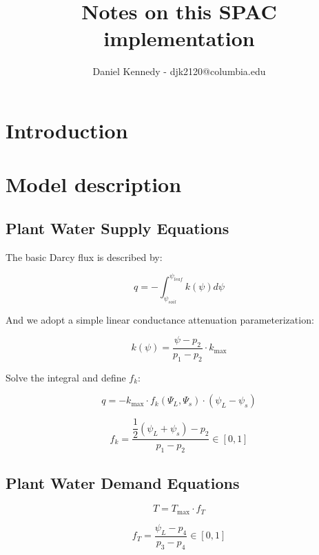 \documentclass[11pt]{article}
\title{Notes on this SPAC implementation\large}
\author{Daniel Kennedy - djk2120@columbia.edu 
}
\begin{document}
\maketitle

\section{Introduction}

\clearpage
\section{Model description}

\subsection{Plant Water Supply Equations}

The basic Darcy flux is described by:

\begin{equation}
q = -\int_{\psi_{soil}}^{\psi_{leaf}}{k\left(\psi\right)d\psi}
\end{equation}

And we adopt a simple linear conductance attenuation parameterization:

\begin{equation}
k(\psi) = \dfrac{\psi - p_2}{p_1 - p_2} \cdot k_\text{max}
\end{equation}

Solve the integral and define $f_k$:

\begin{equation}
q = -k_\text{max}\cdot f_k\left(\Psi_L,\Psi_s\right) \cdot \left(\psi_L-\psi_s\right)
\end{equation}

\begin{equation}
f_k = \dfrac{\dfrac{1}{2} \left(\psi_L+\psi_s\right) - p_2}{p_1 - p_2} \in \left[0,1\right]
\end{equation}


\clearpage
\subsection{Plant Water Demand Equations}
\begin{equation}
T = T_\text{max}\cdot f_T
\end{equation}

\begin{equation}
f_T = \dfrac{\psi_L - p_4}{p_3 - p_4} \in \left[0,1\right]
\end{equation}
\end{document}
